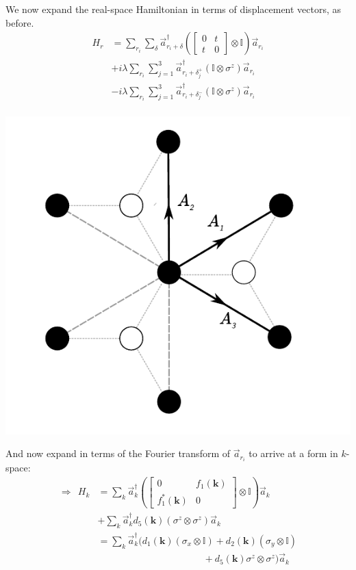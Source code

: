 \documentclass[10pt,a4paper]{article}\usepackage[]{graphicx}\usepackage[]{color}
\begin{document}
\begin{multicols}{2}
We now expand the real-space Hamiltonian in terms of displacement vectors, as before. 
\begin{align*}
H_r &= 
\sum_{r_i}\sum_{\delta}
\vec{a}^{\dagger}_{r_i+\delta}\left(
\begin{bmatrix}
0& t\\
t & 0
\end{bmatrix}\otimes\mathbb{I}\right)
\vec{a}_{r_i}\\
& +i\lambda\sum_{r_i} \sum_{j=1}^3\vec{a}^{\dagger}_{r_i+\delta_j^+}\left(\mathbb{I}\otimes\sigma^z \right)\vec{a}_{r_i}\\
& -i\lambda\sum_{r_i} \sum_{j=1}^3\vec{a}^{\dagger}_{r_i+\delta_j^-}\left(\mathbb{I}\otimes\sigma^z \right)\vec{a}_{r_i}\\
\end{align*}
\begin{center}
\includegraphics[scale=0.65]{hc2nnA.pdf}
\end{center}
\noindent
And now expand in terms of the Fourier transform of $\vec{a}_{r_i}$ to arrive at a form in $k$-space:
\begin{align*}
\Rightarrow \ \ H_k & = \sum_{k}
\vec{a}^{\dagger}_{k}\left(
\begin{bmatrix}
0& f_1(\mathbf{k})\\
f^*_1(\mathbf{k}) & 0
\end{bmatrix}\otimes\mathbb{I}\right)
\vec{a}_{k}\\
& +\sum_{k} \vec{a}^{\dagger}_{k}d_5(\mathbf{k})\left(\sigma^z\otimes\sigma^z \right)\vec{a}_{k}\\
& = \sum_{k}
\vec{a}^{\dagger}_{k}\Big(d_1(\mathbf{k})
(\sigma_x\otimes\mathbb{I})+d_2(\mathbf{k})
(\sigma_y\otimes\mathbb{I})\\
&\quad\quad\quad\quad\quad\quad
\quad\quad\quad\quad\quad
 + d_5(\mathbf{k})\sigma^z\otimes\sigma^z \Big)\vec{a}_{k}\\
\end{align*}


\end{multicols}
\end{document}
